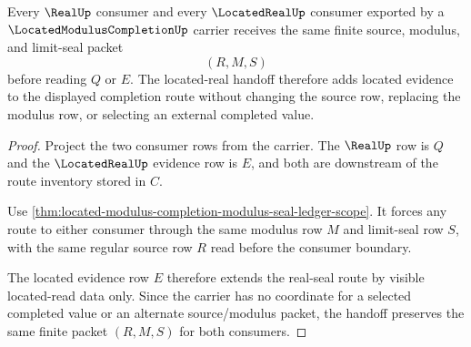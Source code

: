 \begin{theorem}
\label{thm:located-modulus-completion-located-real-handoff}
Every $\RealUp$ consumer and every $\LocatedRealUp$ consumer exported by a $\LocatedModulusCompletionUp$ carrier receives the same finite source, modulus, and limit-seal packet
$$
(R,M,S)
$$
before reading $Q$ or $E$. The located-real handoff therefore adds located evidence to the displayed completion route without changing the source row, replacing the modulus row, or selecting an external completed value.
\end{theorem}
\begin{proof}
Project the two consumer rows from the carrier. The $\RealUp$ row is $Q$ and the $\LocatedRealUp$ evidence row is $E$, and both are downstream of the route inventory stored in $C$.

Use \autoref{thm:located-modulus-completion-modulus-seal-ledger-scope}. It forces any route to either consumer through the same modulus row $M$ and limit-seal row $S$, with the same regular source row $R$ read before the consumer boundary.

The located evidence row $E$ therefore extends the real-seal route by visible located-read data only. Since the carrier has no coordinate for a selected completed value or an alternate source/modulus packet, the handoff preserves the same finite packet $(R,M,S)$ for both consumers.
\end{proof}

